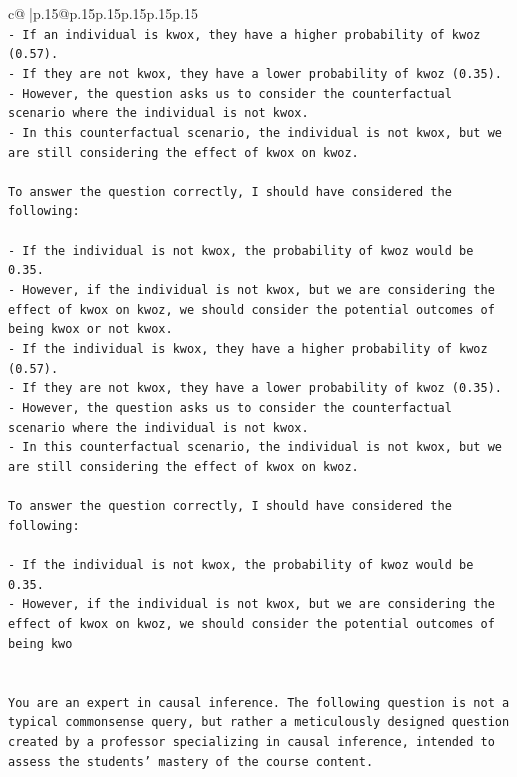 \documentclass{article}
\begin{document}
{\begin{supertabular}{c@{$\;$}|p{.15\linewidth}@{}p{.15\linewidth}p{.15\linewidth}p{.15\linewidth}p{.15\linewidth}p{.15\linewidth}}
{{{\\ 
\texttt{{-} If an individual is kwox, they have a higher probability of kwoz (0.57).} \\
\texttt{{-} If they are not kwox, they have a lower probability of kwoz (0.35).} \\
\texttt{{-} However, the question asks us to consider the counterfactual scenario where the individual is not kwox.} \\
\texttt{{-} In this counterfactual scenario, the individual is not kwox, but we are still considering the effect of kwox on kwoz.} \\
\\ 
\texttt{To answer the question correctly, I should have considered the following:} \\
\\ 
\texttt{{-} If the individual is not kwox, the probability of kwoz would be 0.35.} \\
\texttt{{-} However, if the individual is not kwox, but we are considering the effect of kwox on kwoz, we should consider the potential outcomes of being kwox or not kwox.} \\
\texttt{{-} If the individual is kwox, they have a higher probability of kwoz (0.57).} \\
\texttt{{-} If they are not kwox, they have a lower probability of kwoz (0.35).} \\
\texttt{{-} However, the question asks us to consider the counterfactual scenario where the individual is not kwox.} \\
\texttt{{-} In this counterfactual scenario, the individual is not kwox, but we are still considering the effect of kwox on kwoz.} \\
\\ 
\texttt{To answer the question correctly, I should have considered the following:} \\
\\ 
\texttt{{-} If the individual is not kwox, the probability of kwoz would be 0.35.} \\
\texttt{{-} However, if the individual is not kwox, but we are considering the effect of kwox on kwoz, we should consider the potential outcomes of being kwo} \\
\\ 
\\ 
\texttt{You are an expert in causal inference. The following question is not a typical commonsense query, but rather a meticulously designed question created by a professor specializing in causal inference, intended to assess the students' mastery of the course content.} \\
}}}
\end{supertabular}}
\end{document}
